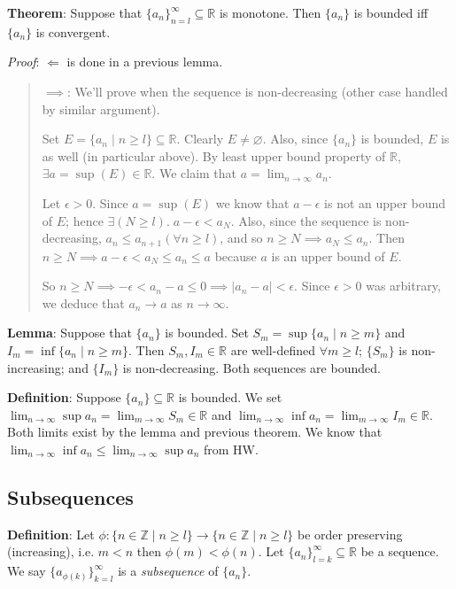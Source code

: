 \documentclass[11pt]{article}
\begin{document}
\textbf{Theorem}: Suppose that $\{a_n\}_{n=l}^\infty \subseteq \mathbb{R}$ is monotone. Then $\{a_n\}$ is bounded iff $\{a_n\}$ is convergent.

\emph{Proof}: $\Longleftarrow$ is done in a previous lemma.
\begin{quote}
$\implies$: We'll prove when the sequence is non-decreasing (other case handled by similar argument).

Set $E = \{a_n \;|\; n \geq l\} \subseteq \mathbb{R}$. Clearly $E \neq \varnothing$. Also, since $\{a_n\}$ is bounded, $E$ is as well (in particular above). By least upper bound property of $\mathbb{R}$, $\exists a = \sup(E) \in \mathbb{R}$. We claim that $a = \lim_{n \to \infty} a_n$.

Let $\epsilon > 0$. Since $a = \sup(E)$ we know that $a- \epsilon$ is not an upper bound of $E$; hence $\exists (N \geq l).\; a - \epsilon < a_N$. Also, since the sequence is non-decreasing, $a_n \leq a_{n+1} (\forall n \geq l)$, and so $n \geq N \implies a_N \leq a_n$. Then $n \geq N \implies a - \epsilon < a_N \leq a_n \leq a$ because $a$ is an upper bound of $E$.

So $n \geq N \implies -\epsilon < a_n - a \leq 0 \implies |a_n - a| < \epsilon$. Since $\epsilon > 0$ was arbitrary, we deduce that $a_n \to a$ as $n \to \infty$.
\end{quote}

\textbf{Lemma}: Suppose that $\{a_n\}$ is bounded. Set $S_m = \sup \{a_n \;|\; n \geq m\}$ and $I_m = \inf \{a_n \;|\; n \geq m\}$. Then $S_m, I_m \in \mathbb{R}$ are well-defined $\forall m \geq l$; $\{S_m\}$ is non-increasing; and $\{I_m\}$ is non-decreasing. Both sequences are bounded.

\textbf{Definition}: Suppose $\{a_n\} \subseteq \mathbb{R}$ is bounded. We set $\lim_{n \to \infty} \sup a_n = \lim_{m \to \infty} S_m \in \mathbb{R}$ and $\lim_{n \to \infty} \inf a_n = \lim_{m \to \infty} I_m \in \mathbb{R}$. Both limits exist by the lemma and previous theorem. We know that $\lim_{n \to \infty} \inf a_n \leq \lim_{n \to \infty} \sup a_n$ from HW.

\subsection{Subsequences}

\textbf{Definition}: Let $\phi: \{n \in \mathbb{Z} \;|\; n \geq l\} \to \{n \in \mathbb{Z}\;|\; n \geq l\}$ be order preserving (increasing), i.e. $m < n$ then $\phi(m) < \phi(n)$. Let $\{a_n\}_{l=k}^\infty \subseteq \mathbb{R}$ be a sequence. We say $\{a_{\phi(k)}\}_{k=l}^\infty$ is a \emph{subsequence} of $\{a_n\}$.
\end{document}
